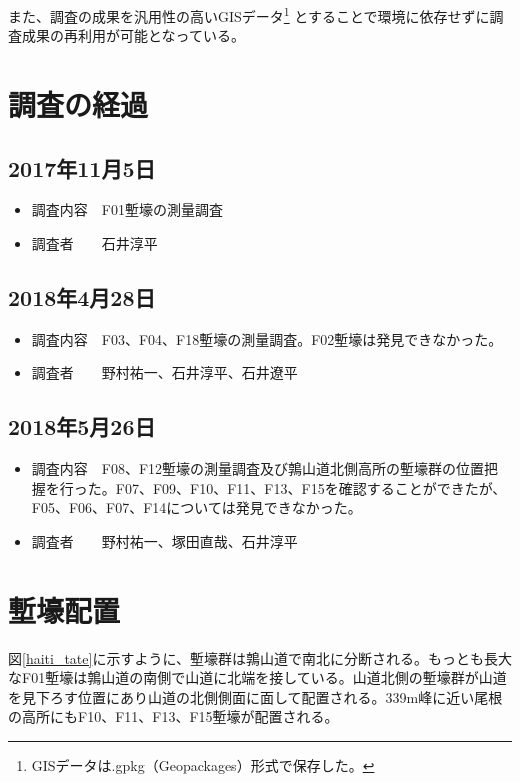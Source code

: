 \documentclass[14Q]{jsarticle}
\begin{document}
また、調査の成果を汎用性の高いGISデータ\footnote{
GISデータは.gpkg（Geopackages）形式で保存した。
}
とすることで環境に依存せずに調査成果の再利用が可能となっている。

\section{調査の経過}
\subsection{2017年11月5日}
\begin{itemize}
\item 調査内容　F01塹壕の測量調査
\item 調査者　　石井淳平
\end{itemize}

\subsection{2018年4月28日}
\begin{itemize}
\item 調査内容　F03、F04、F18塹壕の測量調査。F02塹壕は発見できなかった。
\item 調査者　　野村祐一、石井淳平、石井遼平
\end{itemize}

\subsection{2018年5月26日}
\begin{itemize}
\item 調査内容　F08、F12塹壕の測量調査及び鶉山道北側高所の塹壕群の位置把握を行った。F07、F09、F10、F11、F13、F15を確認することができたが、F05、F06、F07、F14については発見できなかった。
\item 調査者　　野村祐一、塚田直哉、石井淳平
\end{itemize}

\section{塹壕配置}
図\ref{haiti_tate}に示すように、塹壕群は鶉山道で南北に分断される。もっとも長大なF01塹壕は鶉山道の南側で山道に北端を接している。山道北側の塹壕群が山道を見下ろす位置にあり山道の北側側面に面して配置される。339m峰に近い尾根の高所にもF10、F11、F13、F15塹壕が配置される。
\end{document}

